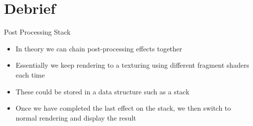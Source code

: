 \part{Debrief}
\frame{\partpage}

\begin{frame}{Post Processing Stack}
	\begin{itemize}
		\pause\item In theory we can chain post-processing effects together
		\pause\item Essentially we keep rendering to a texturing using different fragment shaders each time
		\pause\item These could be stored in a data structure such as a stack
		\pause\item Once we have completed the last effect on the stack, we then switch to normal rendering and display the result
	\end{itemize}
\end{frame}